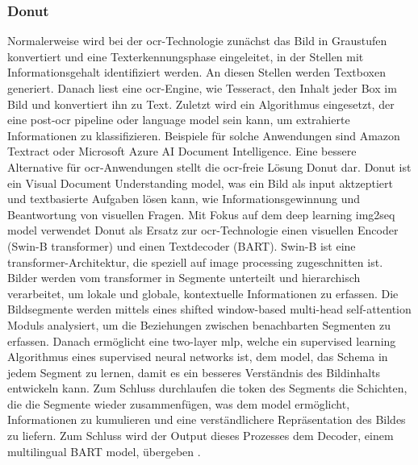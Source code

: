\subsubsection{Donut}
Normalerweise wird bei der \gls{ocr}-Technologie zunächst das Bild in Graustufen konvertiert und eine Texterkennungsphase eingeleitet, in der Stellen mit Informationsgehalt identifiziert werden. An diesen Stellen werden Textboxen generiert. Danach liest eine \gls{ocr}-Engine, wie Tesseract, den Inhalt jeder Box im Bild und konvertiert ihn zu Text. Zuletzt wird ein Algorithmus eingesetzt, der eine post-\gls{ocr} pipeline oder language model sein kann, um extrahierte Informationen zu klassifizieren. Beispiele für solche Anwendungen sind Amazon Textract oder Microsoft Azure AI Document Intelligence. Eine bessere Alternative für \gls{ocr}-Anwendungen stellt die \gls{ocr}-freie Lösung Donut dar. Donut ist ein Visual Document Understanding model, was ein Bild als input aktzeptiert und textbasierte Aufgaben lösen kann, wie Informationsgewinnung und Beantwortung von visuellen Fragen. Mit Fokus auf dem deep learning img2seq model verwendet Donut als Ersatz zur \gls{ocr}-Technologie einen visuellen Encoder (Swin-B transformer) und einen Textdecoder (BART). Swin-B ist eine transformer-Architektur, die speziell auf image processing zugeschnitten ist. Bilder werden vom transformer in Segmente unterteilt und hierarchisch verarbeitet, um lokale und globale, kontextuelle Informationen zu erfassen. Die Bildsegmente werden mittels eines shifted window-based multi-head self-attention Moduls analysiert, um die Beziehungen zwischen benachbarten Segmenten zu erfassen. Danach ermöglicht eine two-layer \gls{mlp}, welche ein supervised learning Algorithmus eines supervised neural networks ist, dem model, das Schema in jedem Segment zu lernen, damit es ein besseres Verständnis des Bildinhalts entwickeln kann. Zum Schluss durchlaufen die token des Segments die Schichten, die die Segmente wieder zusammenfügen, was dem model ermöglicht, Informationen zu kumulieren und eine verständlichere Repräsentation des Bildes zu liefern. Zum Schluss wird der Output dieses Prozesses dem Decoder, einem multilingual BART model, übergeben \cite{transformers-ocr}.

